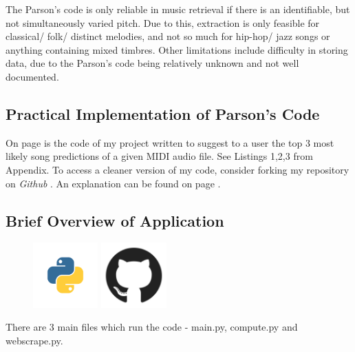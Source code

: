 \documentclass[a4paper,12pt]{article}
\begin{document}
The Parson's code is only reliable in music retrieval if there is an identifiable, 
but not simultaneously varied pitch. Due to this, extraction is only feasible for classical/ folk/ distinct melodies, and not so much for hip-hop/ jazz
songs or anything containing mixed timbres. Other limitations include difficulty in storing data, due to the Parson's code being relatively unknown and not well documented.

\subsection{Practical Implementation of Parson's Code}
\label{sec2}
On page \pageref{Appendix} is the code of my project written to suggest to a user the top 3 most likely song predictions of a given MIDI audio file. See Listings 1,2,3 from Appendix.
To access a cleaner version of my code, consider forking my repository on \textit{Github} \parencite{GitHubRepo}. An explanation can be found on page \pageref{explanationofcode}.

\newpage
\subsection{Brief Overview of Application}
\label{explanationofcode}

\begin{figure}[h!]
    \centerline{%
    \includegraphics[width =2.5cm]{PythonLogo.png}
    \includegraphics[width = 2.5cm]{GithubLogo.png}
    }%
\end{figure}

%
%
%

There are 3 main files which run the code - main.py, compute.py and webscrape.py. 
\end{document}
